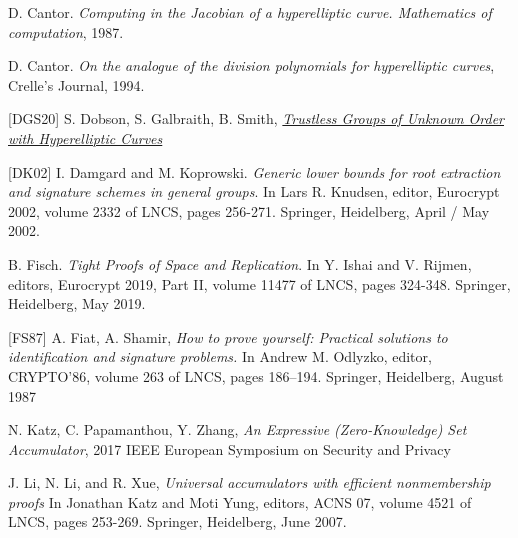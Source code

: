 \documentclass[11pt, lettersize, notitlepage, leqno, footskip=0.6cm]{article}
\newcommand{\noin}{\noindent}
\numberwithin{equation}{section}
\begin{document}

\noindent [Can87] D. Cantor. \textit{Computing in the Jacobian of a hyperelliptic curve. Mathematics of computation}, 1987.\vspace{0.1cm}

\noindent [Can94] D. Cantor. \textit{On the analogue of the division polynomials for hyperelliptic curves}, Crelle's Journal, 1994.\vspace{0.1cm}


\noindent \hypertarget{DGS20}{[DGS20]} S. Dobson, S. Galbraith, B. Smith, \href{https://eprint.iacr.org/2020/196}{\textit{Trustless Groups of Unknown Order with Hyperelliptic Curves}} \vspace{0.1cm}

\noin \hypertarget{{DK02}}{[DK02]} I. Damgard and M. Koprowski. \textit{Generic lower bounds for root extraction and signature schemes in general groups}. In Lars R. Knudsen, editor, Eurocrypt 2002, volume 2332 of LNCS, pages 256-271. Springer, Heidelberg, April / May 2002.\vspace{0.1cm}

\noin [Fis18] B. Fisch. \textit{Tight Proofs of Space and Replication}. In Y. Ishai and V. Rijmen, editors, Eurocrypt 2019, Part II, volume 11477 of LNCS, pages 324-348. Springer, Heidelberg, May 2019. \vspace{0.1cm}

\noindent \hypertarget{FS87}{[FS87]} A. Fiat, A. Shamir, \textit{How to prove yourself: Practical solutions to identification and signature problems.} In Andrew M. Odlyzko, editor, CRYPTO’86, volume 263 of LNCS, pages 186–194. Springer, Heidelberg, August 1987\vspace{0.1cm}

\noin [KPZ17] N. Katz, C. Papamanthou, Y. Zhang, \textit{An Expressive (Zero-Knowledge) Set Accumulator}, 2017 IEEE European Symposium on Security and Privacy \vspace{0.1cm}

\noin [LLX07] J. Li, N. Li, and R. Xue,  \textit{Universal accumulators with efficient nonmembership proofs} In Jonathan Katz and Moti Yung, editors, ACNS 07, volume 4521 of LNCS, pages 253-269. Springer, Heidelberg, June 2007.\vspace{0.1cm}
\end{document}
